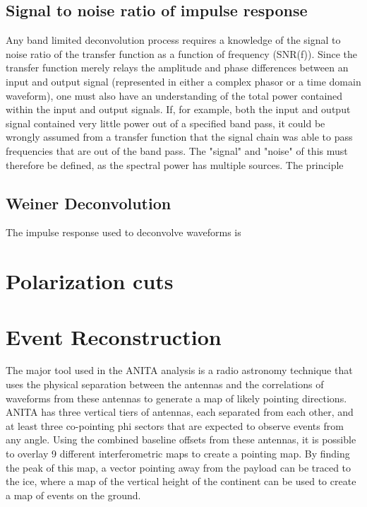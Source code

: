 	\subsection{Signal to noise ratio of impulse response}
		Any band limited deconvolution process requires a knowledge of the signal to noise ratio of the transfer function as a function of frequency (SNR(f)).  Since the transfer function merely relays the amplitude and phase differences between an input and output signal (represented in either a complex phasor or a time domain waveform), one must also have an understanding of the total power contained within the input and output signals.  If, for example, both the input and output signal contained very little power out of a specified band pass, it could be wrongly assumed from a transfer function that the signal chain was able to pass frequencies that are out of the band pass.
		The "signal" and "noise" of this must therefore be defined, as the spectral power has multiple sources.  The principle   
	\subsection{Weiner Deconvolution}
		The impulse response used to deconvolve waveforms is 

\section{Polarization cuts}

\section{Event Reconstruction}
	The major tool used in the ANITA analysis is a radio astronomy technique that uses the physical separation between the antennas and the correlations of waveforms from these antennas to generate a map of likely pointing directions.  ANITA has three vertical tiers of antennas, each separated from each other, and at least three co-pointing phi sectors that are expected to observe events from any angle.  Using the combined baseline offsets from these antennas, it is possible to overlay 9 different interferometric maps to create a pointing map.  By finding the peak of this map, a vector pointing away from the payload can be traced to the ice, where a map of the vertical height of the continent can be used to create a map of events on the ground.
